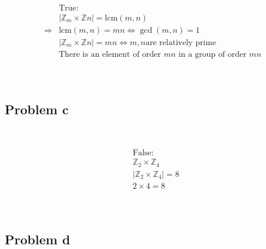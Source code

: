 \documentclass{article}
\begin{document}
~

\begin{equation*}
    \begin{split}
        &\text{True}:\\
        &|\mathbb{Z} _m\times\mathbb{Z} n|=\text{lcm}(m,n)\\
        \Rightarrow&\text{lcm}(m,n)=mn\Leftrightarrow \gcd(m,n)=1\\
        &|\mathbb{Z} _m\times\mathbb{Z} n|=mn\Leftrightarrow m,n\text{are relatively prime}\\
        &\text{There is an element of order }mn\text{ in a group of order }mn\\
    \end{split}
\end{equation*}

~

\subsection*{Problem c}

~

\begin{equation*}
    \begin{split}
        &\text{False}:\\
        &\mathbb{Z} _2\times\mathbb{Z} _4\\
        &|\mathbb{Z} _2\times\mathbb{Z} _4|=8\\
        &2\times 4=8\\
    \end{split}
\end{equation*}

~

\subsection*{Problem d}

~
\end{document}

